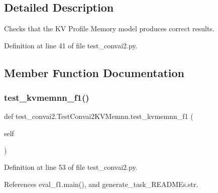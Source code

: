 \subsection{Detailed Description}
\begin{DoxyVerb}Checks that the KV Profile Memory model produces correct results.
\end{DoxyVerb}
 

Definition at line 41 of file test\+\_\+convai2.\+py.



\subsection{Member Function Documentation}
\mbox{\label{classtest__convai2_1_1TestConvai2KVMemnn_a85c9f140bc57a1f1e8b011a2034e74fc}} 
\subsubsection{\texorpdfstring{test\+\_\+kvmemnn\+\_\+f1()}{test\_kvmemnn\_f1()}}
{\footnotesize\ttfamily def test\+\_\+convai2.\+Test\+Convai2\+K\+V\+Memnn.\+test\+\_\+kvmemnn\+\_\+f1 (\begin{DoxyParamCaption}\item[{}]{self }\end{DoxyParamCaption})}



Definition at line 53 of file test\+\_\+convai2.\+py.



References eval\+\_\+f1.\+main(), and generate\+\_\+task\+\_\+\+R\+E\+A\+D\+M\+Es.\+str.


